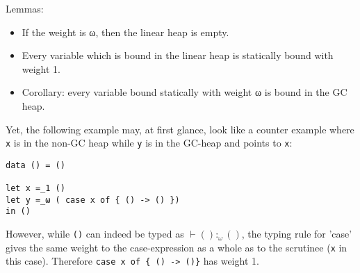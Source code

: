 \documentclass[11pt]{article}
\begin{document}
Lemmas:
\begin{itemize}
\item If the weight is ω, then the linear heap is empty.

\item Every variable which is bound in the linear heap is statically
  bound with weight 1.
\item Corollary: every variable bound statically with weight ω is
  bound in the GC heap.
\end{itemize}















Yet, the following example may, at first glance, look like a counter
example where \verb|x| is in the non-GC heap while \verb|y| is in the
GC-heap and points to \verb|x|:
\begin{verbatim}
data () = ()

let x =_1 ()
let y =_ω ( case x of { () -> () })
in ()
\end{verbatim}
However, while \verb|()| can indeed be typed as $⊢ () :_ω ()$, the
typing rule for 'case' gives the same weight to the case-expression as
a whole as to the scrutinee (\verb|x| in this case). Therefore
\verb|case x of { () -> ()}| has weight 1.
\end{document}

